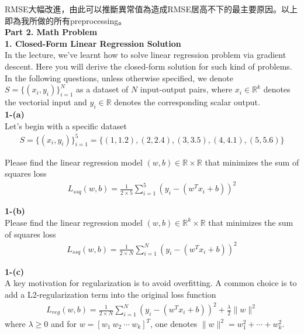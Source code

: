 \documentclass{article}
\begin{document}
RMSE大幅改進，由此可以推斷異常值為造成RMSE居高不下的最主要原因。以上即為我所做的所有preprocessing。\\[12pt]

\noindent
{\bf \LARGE Part 2. Math Problem}\\

\noindent
{\bf \Large 1. Closed-Form Linear Regression Solution}\\

In the lecture, we've learnt how to solve linear regression problem via gradient descent. Here you will derive the closed-form solution for such kind of problems.\\

In the following questions, unless otherwise specified, we denote $S = \{(x_i, y_i)\}^N_{i = 1}$ as a dataset of $N$ input-output pairs, where $x_i \in {\mathbb R}^k$ denotes the vectorial input and $y_i \in {\mathbb R}$ denotes the corresponding scalar output.\\

\noindent
{\bf 1-(a)}\\

Let's begin with a specific dataset
\begin{align*}
    S = \{(x_i, y_i)\}^5_{i = 1} = \{(1, 1.2), (2, 2.4), (3, 3.5), (4, 4.1), (5, 5.6)\}
\end{align*}

Please find the linear regression model $(w, b) \in {\mathbb R} \times {\mathbb R}$ that minimizes the sum of squares loss
\begin{align*}
    L_{ssq}(w, b) = \frac{1}{2 \times 5} \sum_{i = 1}^5 (y_i − (w^T x_i + b))^2
\end{align*}

\noindent
{\bf 1-(b)}\\

Please find the linear regression model $(w, b) \in {\mathbb R}^k \times {\mathbb R}$ that minimizes the sum of squares loss
\begin{align*}
    L_{ssq}(w, b) = \frac{1}{2 \times N} \sum_{i = 1}^N (y_i − (w^T x_i + b))^2
\end{align*}

\noindent
{\bf 1-(c)}\\

A key motivation for regularization is to avoid overfitting. A common choice is to add a L2-regularization term into the original loss function
\begin{align*}
    L_{reg}(w, b) = \frac{1}{2 \times N} \sum_{i = 1}^N (y_i − (w^T x_i + b))^2 + \frac{\lambda}{2} \| w \|^2
\end{align*}
where $\lambda \ge 0$ and for $w = [w_1\ w_2\ \cdots\ w_k]^T$, one denotes $\| w \|^2 = w^2_1 + \cdots + w^2_k$.\\
\end{document}
